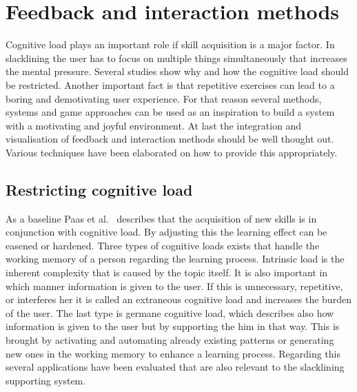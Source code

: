 \section{Feedback and interaction methods}\label{2_4_methods}

Cognitive load plays an important role if skill acquisition is a major factor. In slacklining the user has to focus on multiple things simultaneously that increases the mental pressure. Several studies show why and how the cognitive load should be restricted. Another important fact is that repetitive exercises can lead to a boring and demotivating user experience. For that reason several methods, systems and game approaches can be used as an inspiration to build a system with a motivating and joyful environment. At last the integration and visualisation of feedback and interaction methods should be well thought out. Various techniques have been elaborated on how to provide this appropriately.

\subsection{Restricting cognitive load}

As a baseline Paas et al.~\cite{Paas2003-xt} describes that the acquisition of new skills is in conjunction with cognitive load. By adjusting this the learning effect can be easened or hardened. Three types of cognitive loads exists that handle the working memory of a person regarding the learning process. Intrinsic load is the inherent complexity that is caused by the topic itself. It is also important in which manner information is given to the user. If this is unnecessary, repetitive, or interferes her it is called an extraneous cognitive load and increases the burden of the user. The last type is germane cognitive load, which describes also how information is given to the user but by supporting the him in that way. This is brought by activating and automating already existing patterns or generating new ones in the working memory to enhance a learning process. Regarding this several applications have been evaluated that are also relevant to the slacklining supporting system.


